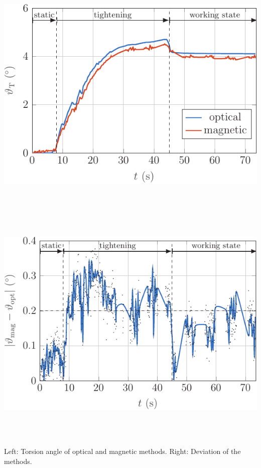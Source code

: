 \begin{multicols}{2}
\begin{mdboxshad}
				\begin{figurehere}
					{\includegraphics[height=12cm]{IMG/abs_ang_posterp-crop.pdf}}\hfill
					{\includegraphics[height=12cm]{IMG/diff_posterp-crop.pdf}} 
					\vspace{-5mm}\caption{Left: Torsion angle of optical and magnetic methods. Right: Deviation of the methods.}
					\label{fig:winkelfehler_differenz}
				\end{figurehere} 
				

\end{mdboxshad}
\end{multicols}
